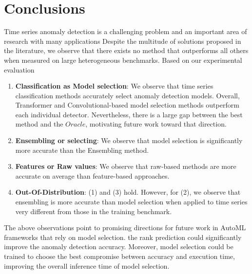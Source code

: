 \section{Conclusions}
\label{sec:conclusions}

Time series anomaly detection is a challenging problem and an important area of research with many applications  Despite the multitude of solutions proposed in the literature, we observe that there exists no method that outperforms all others when measured on large heterogeneous benchmarks. Based on our experimental evaluation

\begin{enumerate}%
	\item \textbf{Classification as Model selection}: We observe that time series classification methods accurately select anomaly detection models. Overall, Transformer and Convolutional-based model selection methods outperform each individual detector. Nevertheless, there is a large gap between the best method and the $Oracle$, motivating future work toward that direction.
	\item \textbf{Ensembling or selecting}: We observe that model selection is significantly more accurate than the Ensembling method.
	\item \textbf{Features or Raw values}: We observe that raw-based methods are more accurate on average than feature-based approaches.
	\item \textbf{Out-Of-Distribution}: (1) and (3) hold. However, for (2), we observe that ensembling is more accurate than model selection when applied to time series very different from those in the training benchmark.
\end{enumerate}

The above observations point to promising directions for future work in AutoML frameworks that rely on model selection.  the rank prediction could significantly improve the anomaly detection accuracy. Moreover, model selection could be trained to choose the best compromise between accuracy and execution time, improving the overall inference time of model selection. %


